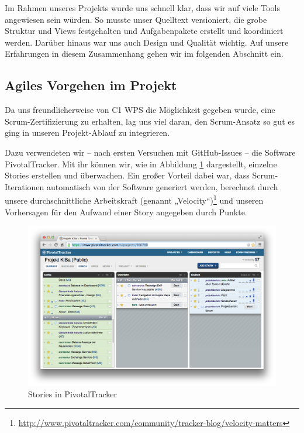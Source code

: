 Im Rahmen unseres Projekts wurde uns schnell klar, dass wir auf viele Tools angewiesen sein würden. So musste unser Quelltext versioniert, die grobe Struktur und Views festgehalten und Aufgabenpakete erstellt und koordiniert werden. Darüber hinaus war uns auch Design und Qualität wichtig. Auf unsere Erfahrungen in diesem Zusammenhang gehen wir im folgenden Abschnitt ein.

\subsection{Agiles Vorgehen im Projekt}
	Da uns freundlicherweise von C1 WPS die Möglichkeit gegeben wurde, eine Scrum-Zer\-ti\-fi\-zie\-rung zu erhalten, lag uns viel daran, den Scrum-Ansatz so gut es ging in unseren Projekt-Ablauf zu integrieren.
	
	Dazu verwendeten wir – nach ersten Versuchen mit GitHub-Issues – die Software PivotalTracker. Mit ihr können wir, wie in Abbildung \ref{fig:TrackerStories} dargestellt, einzelne Stories erstellen und überwachen. Ein großer Vorteil dabei war, dass Scrum-Iterationen automatisch von der Software generiert werden, berechnet durch unsere durchschnittliche Arbeitskraft (genannt „Velocity“)\footnote{\url{http://www.pivotaltracker.com/community/tracker-blog/velocity-matters}} und unseren Vorhersagen für den Aufwand einer Story angegeben durch Punkte.
	
\begin{figure}[h!]
	\centering
	\includegraphics[scale=.25]{Pictures/TrackerStories}
	\vspace{-.8cm}
	\caption{Stories in PivotalTracker\label{fig:TrackerStories}}
\end{figure}

